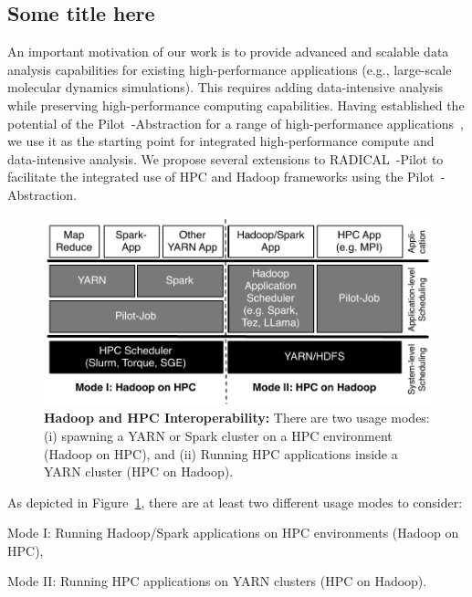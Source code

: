 \subsection{Some title here}
An important motivation of our work is to provide advanced and scalable data analysis capabilities for existing high-performance applications (e.g., large-scale molecular dynamics simulations).
This requires adding data-intensive analysis while preserving high-performance computing capabilities.
Having established the potential of the Pilot~-Abstraction for a range of high-performance applications~\cite{treikalis2016repex,ragothaman2014developing,ko2014numerical}, we use it as the starting point for integrated high-performance compute and data-intensive analysis.
We propose several extensions to RADICAL~-Pilot to facilitate the integrated use of HPC and Hadoop frameworks using the Pilot~-Abstraction.

\begin{figure}[t]
    \centering
    \includegraphics[width=.95\textwidth]{figures/data_analytics_hpc/hpc_hadoop/hadoop-on-hpc-viceverse.pdf}
    \caption{\textbf{Hadoop and HPC Interoperability:}
        There are two usage modes:
        (i) spawning a YARN or Spark cluster on a HPC environment (Hadoop on HPC), and
        (ii) Running HPC applications inside a YARN cluster (HPC on Hadoop).
        \label{fig:figures_hadoop-on-hpc-viceverse}}
\end{figure}

As depicted in Figure~\ref{fig:figures_hadoop-on-hpc-viceverse}, there are at least two different usage modes to consider:
\begin{compactenum}[(i)]
    \item Mode I: Running Hadoop/Spark applications on HPC environments (Hadoop on HPC),
    \item Mode II: Running HPC applications on YARN clusters (HPC on Hadoop).
\end{compactenum}

